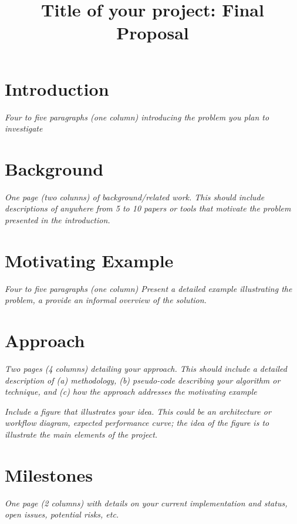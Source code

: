 \documentclass[review,twocolumn,preprint]{sigplanconf}
\begin{document}
\title{Title of your project: Final Proposal}
\date{}

\maketitle


\section{Introduction}

\emph{Four to five paragraphs (one column) introducing the problem you
  plan to investigate}


\section{Background}

\emph{One page (two colunns) of background/related work.  This should
  include descriptions of anywhere from 5 to 10 papers or tools that motivate
  the  problem presented in the introduction.}


\section{Motivating Example}

\emph{Four to five paragraphs (one column) Present a detailed example
  illustrating the problem, a provide an informal overview of the
  solution.}

\section{Approach}

\emph{Two pages (4 columns) detailing your approach.  This should
  include a detailed description of (a) methodology, (b) pseudo-code
  describing your algorithm or technique, and (c) how the approach
  addresses the motivating example}

\emph{Include a figure that illustrates your idea.  This could be an
  architecture or workflow diagram, expected performance curve; the
  idea of the figure is to illustrate the main elements of the project.}

\section{Milestones}

\emph{One page (2 columns) with details on your current implementation
  and status, open issues, potential risks, etc.}


\end{document}
